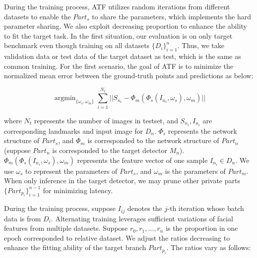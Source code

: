 \documentclass[journal,transmag]{IEEEtran}
\begin{document}
During the training process,  ATF utilizes random iterations from different datasets to enable the $Part_s$ to share the parameters, 
which implements the hard parameter sharing.
We also exploit decreasing proportion to enhance the ability to fit the target task.
In the first situation, our evaluation is on only target benchmark even though training on all datasets $\{D_i\}_{i=1}^n$.
Thus, we take validation data or test data of the target dataset as test, which is the same as common training.
For the first scenario, the goal of ATF is to minimize the normalized mean error between the ground-truth points and predictions as below:

\begin{equation}
   \label{eq:goal}
   \mathop{\arg\min}_{\{\omega_s,\omega_m\}} \sum_{i=1}^{N_{t}} ||S_{n_i} - \Phi_m(\Phi_s(I_{n_i},\omega_s),\omega_m) ||
\end{equation}

where $N_t$ represents the number of images in testset, 
and $S_{n_i},I_{n_i}$ are corresponding landmarks and input image for $D_n$.
$\Phi_s$ represents the network structure of $Part_s$, 
and $\Phi_m$ is corresponded to the network structure of $Part_n$ (suppose $Part_n$ is corresponded to the target detector $M_n$).
$\Phi_m(\Phi_s(I_{n_i},\omega_s),\omega_m)$ represents the feature vector of one sample $I_{n_i} \in D_n$.
We use $\omega_s$ to represent the parameters of $Part_s$,
and $\omega_m$ is the parameters of $Part_m$.
When only inference in the target detector, we may prune other private parts $\{Part_{p_i}\}_{i=1}^{n-1}$ for minimizing latency.

During the training process, suppose $I_{ij}$ denotes the $j$-th iteration whose batch data is from $D_i$.
Alternating training leverages sufficient variations of facial features from multiple datasets.
Suppose $r_0,r_1,\dots,r_n$ is the proportion in one epoch corresponded to relative dataset.
We adjust the ratios decreasing to enhance the fitting ability of the target branch $Part_{p_i}$.
The ratios vary as follows: 
\end{document}
